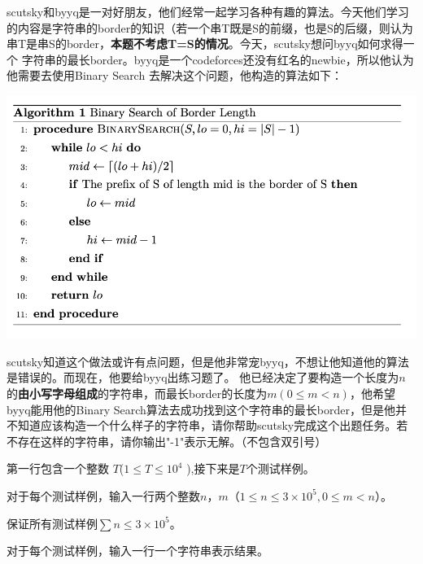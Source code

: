 
scutsky和byyq是一对好朋友，他们经常一起学习各种有趣的算法。今天他们学习的内容是字符串的border的知识（若一个串T既是S的前缀，也是S的后缀，则认为串T是串S的border，\textbf{本题不考虑T=S的情况}。今天，scutsky想问byyq如何求得一个
字符串的最长border。byyq是一个codeforces还没有红名的newbie，所以他认为他需要去使用Binary Search
去解决这个问题，他构造的算法如下：

\includegraphics[width=.9\linewidth]{image4.png}

scutsky知道这个做法或许有点问题，但是他非常宠byyq，不想让他知道他的算法是错误的。而现在，他要给byyq出练习题了。
他已经决定了要构造一个长度为$n$的\textbf{由小写字母组成}的字符串，而最长border的长度为$m(0 \leqslant m < n)$，他希望byyq能用他的Binary Search算法去成功找到这个字符串的最长border，但是他并不知道应该构造一个什么样子的字符串，请你帮助scutsky完成这个出题任务。若不存在这样的字符串，请你输出"-1"表示无解。（不包含双引号）


第一行包含一个整数 $T$($1 \leqslant T \leqslant 10^4$  ),接下来是$T$个测试样例。

对于每个测试样例，输入一行两个整数$n$，$m$（$1\leqslant n \leqslant 3 \times 10^5 , 0 \leqslant m < n$）。

保证所有测试样例$\sum n\leqslant 3\times 10^5$。


对于每个测试样例，输入一行一个字符串表示结果。

